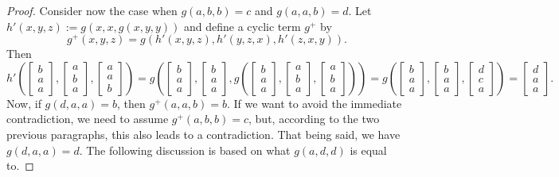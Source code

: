\documentclass[11pt]{amsart}
\theoremstyle{definition}
\theoremstyle{remark}
\theoremstyle{plain}
\begin{document}
\begin{enumerate}[wide, labelindent=0pt]
\begin{proof}
Consider now the case when $g(a,b,b)=c$ and $g(a,a,b)=d$. Let $h'(x,y,z):=g(x,x,g(x,y,y))$ and define a cyclic term $g^+$ by $$g^+(x,y,z)=g(h'(x,y,z),h'(y,z,x),h'(z,x,y)).$$ Then 
\begin{equation*}
h'\left(
\begin{bmatrix}
b \\
a \\
a
\end{bmatrix}\!,\!
\begin{bmatrix}
a \\
b \\
a
\end{bmatrix}\!,\!
\begin{bmatrix}
a \\
a \\
b
\end{bmatrix}
\right)=
g\left(
\begin{bmatrix}
b \\
a \\
a
\end{bmatrix}\!,\!
\begin{bmatrix}
b \\
a \\
a
\end{bmatrix}\!,\!
g\left(
\begin{bmatrix}
b \\
a \\
a
\end{bmatrix}\!,\!
\begin{bmatrix}
a \\
b \\
a
\end{bmatrix}\!,\!
\begin{bmatrix}
a \\
b \\
a
\end{bmatrix}
\right)
\right)=
g\left(
\begin{bmatrix}
b \\
a \\
a
\end{bmatrix}\!,\!
\begin{bmatrix}
b \\
a \\
a
\end{bmatrix}\!,\!
\begin{bmatrix}
d \\
c \\
a
\end{bmatrix}
\right)=
\begin{bmatrix}
d \\
a\\
a
\end{bmatrix}.
\end{equation*}
Now, if $g(d,a,a)=b$, then $g^+(a,a,b)=b$. If we want to avoid the immediate contradiction, we need to assume $g^+(a,b,b)=c$, but, according to the two previous paragraphs, this also leads to a contradiction. That being said, we have $g(d,a,a)=d$. The following discussion is based on what $g(a,d,d)$ is equal to. 


\end{proof}
\end{enumerate}
\end{document}
